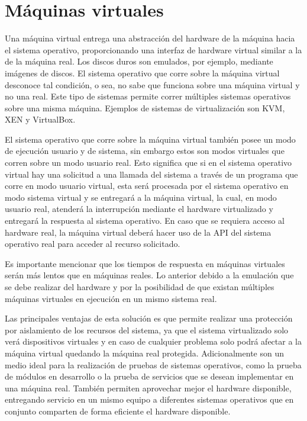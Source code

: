 %
%
%
%

\chapter{Máquinas virtuales}
Una máquina virtual entrega una abstracción del hardware de la máquina hacia el
sistema operativo, proporcionando una interfaz de hardware virtual similar a la
de la máquina real. Los discos duros son emulados, por ejemplo, mediante
imágenes de discos. El sistema operativo que corre sobre la máquina virtual
desconoce tal condición, o sea, no sabe que funciona sobre una máquina virtual y
no una real. Este tipo de sistemas permite correr múltiples sistemas operativos
sobre una misma máquina. Ejemplos de sistemas de virtualización son KVM, XEN y
VirtualBox.

El sistema operativo que corre sobre la máquina virtual también posee un modo de
ejecución usuario y de sistema, sin embargo estos son modos virtuales que corren
sobre un modo usuario real. Esto significa que si en el sistema operativo
virtual hay una solicitud a una llamada del sistema a través de un programa que
corre en modo usuario virtual, esta será procesada por el sistema operativo en
modo sistema virtual y se entregará a la máquina virtual, la cual, en modo
usuario real, atenderá la interrupción mediante el hardware virtualizado y
entregará la respuesta al sistema operativo. En caso que se requiera acceso al
hardware real, la máquina virtual deberá hacer uso de la API del sistema
operativo real para acceder al recurso solicitado.

Es importante mencionar que los tiempos de respuesta en máquinas virtuales serán
más lentos que en máquinas reales. Lo anterior debido a la emulación que se debe
realizar del hardware y por la posibilidad de que existan múltiples máquinas
virtuales en ejecución en un mismo sistema real.

Las principales ventajas de esta solución es que permite realizar una protección
por aislamiento de los recursos del sistema, ya que el sistema virtualizado solo
verá dispositivos virtuales y en caso de cualquier problema solo podrá afectar a
la máquina virtual quedando la máquina real protegida. Adicionalmente son un
medio ideal para la realización de pruebas de sistemas operativos, como la
prueba de módulos en desarrollo o la prueba de servicios que se desean
implementar en una máquina real. También permiten aprovechar mejor el hardware
disponible, entregando servicio en un mismo equipo a diferentes sistemas
operativos que en conjunto comparten de forma eficiente el hardware disponible.
